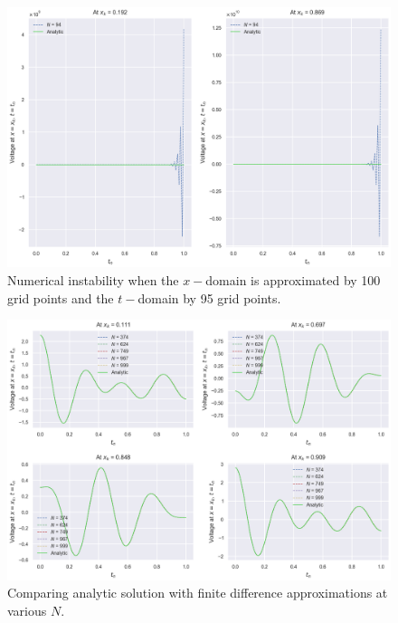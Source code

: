 \documentclass{article}
\begin{document}
\begin{figure}[t!]
	\centering
	\includegraphics[scale=0.7]{on temporal domain discretization - finite time blowup.png}
	\caption{Numerical instability when the $x-$domain is approximated by 100 grid points and the $t-$domain by 95 grid points.}
	\label{fig: On Temporal Domain Discretization results: Finite time blowup}
\end{figure}

\begin{figure}[t!]
	\centering
	\includegraphics[scale=0.7]{on temporal domain discretization - analytic vs numerical.png}
	\caption{Comparing analytic solution with finite difference approximations at various $N$.}
	\label{fig: On Temporal Domain Discretization results: Analytic vs numerical solutions}
\end{figure}
\end{document}
